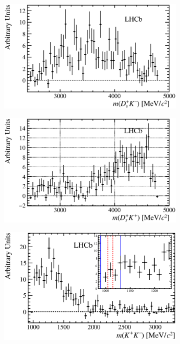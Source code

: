 \begin{figure}[!h]
    \centering
    \begin{subfigure}[t]{0.49\textwidth}
        \includegraphics[width=1.0\textwidth]{figs/B2DsKK/DsKm_mass_sweighted.eps}
    \end{subfigure}
    \begin{subfigure}[t]{0.49\textwidth}
        \includegraphics[width=1.0\textwidth]{figs/B2DsKK/DsKp_mass_sweighted.eps}
    \end{subfigure}
    \begin{subfigure}[t]{0.49\textwidth}
        \includegraphics[width=1.0\textwidth]{figs/B2DsKK/phi_mass_sweighted.eps}

\end{subfigure}
\end{figure}
